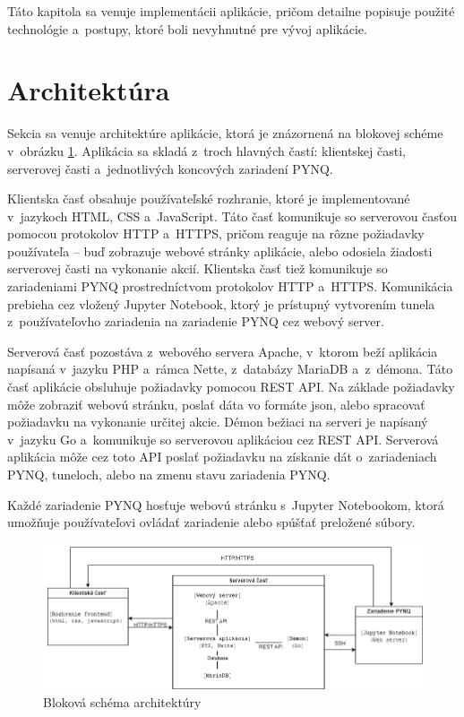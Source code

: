 Táto kapitola sa venuje implementácii aplikácie, pričom detailne popisuje použité technológie a~postupy, ktoré boli nevyhnutné pre vývoj aplikácie.

\section{Architektúra}

Sekcia sa venuje architektúre aplikácie, ktorá je znázornená na blokovej schéme v~obrázku \ref{Blokova schema}. Aplikácia sa skladá z~troch hlavných častí: klientskej časti, serverovej časti a~jednotlivých koncových zariadení PYNQ.

Klientska časť obsahuje používateľské rozhranie, ktoré je implementované v~jazykoch HTML, CSS a~JavaScript. Táto časť komunikuje so serverovou časťou pomocou protokolov HTTP a~HTTPS, pričom reaguje na rôzne požiadavky používateľa – buď zobrazuje webové stránky aplikácie, alebo odosiela žiadosti serverovej časti na vykonanie akcií. Klientska časť tiež komunikuje so zariadeniami PYNQ prostredníctvom protokolov HTTP a~HTTPS. Komunikácia prebieha cez vložený Jupyter Notebook, ktorý je prístupný vytvorením tunela z~používateľovho zariadenia na zariadenie PYNQ cez webový server.

Serverová časť pozostáva z~webového servera Apache, v~ktorom beží aplikácia napísaná v~jazyku PHP a~rámca Nette, z~databázy MariaDB a~z~démona. Táto časť aplikácie obsluhuje požiadavky pomocou REST API. Na základe požiadavky môže zobraziť webovú stránku, poslať dáta vo formáte json, alebo spracovať požiadavku na vykonanie určitej akcie. Démon bežiaci na serveri je napísaný v~jazyku Go a~komunikuje so serverovou aplikáciou cez REST API. Serverová aplikácia môže cez toto API poslať požiadavku na získanie dát o~zariadeniach PYNQ, tuneloch, alebo na zmenu stavu zariadenia PYNQ.

Každé zariadenie PYNQ hosťuje webovú stránku s~Jupyter Notebookom, ktorá umožňuje používateľovi ovládať zariadenie alebo spúšťať preložené súbory.


\begin{figure}[t] \label{Blokova schema}
    \centering
    \includegraphics[width=1\linewidth]{obrazky-figures/block_diagram_architecture.png}
    \caption{Bloková schéma architektúry}
\end{figure}

